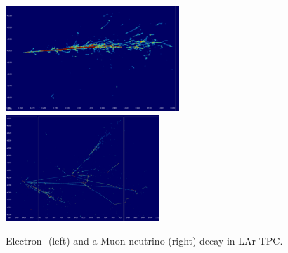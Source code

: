 \vspace{-0.2cm}
\begin{figure}[!ht]
\begin{center}
\includegraphics[width=.35\textwidth, height=4cm]{eNu_event}
\includegraphics[width=.35\textwidth, height=4cm]{muNu_event}
\vspace{-0.5cm}
\caption{Electron- (left) and a Muon-neutrino (right) decay in LAr TPC.}
\label{fig:evDisplay}
\end{center}
\end{figure}
\vspace{-0.5cm}

